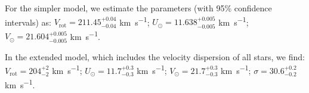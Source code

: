 For the simpler model, we estimate the parameters (with 95\% confidence intervals) as:  
$V_{\text{rot}} = 211.45_{-0.04}^{+0.04}$ \unit{\kilo\meter\per\second};  
$U_{\odot} = 11.638_{-0.005}^{+0.005}$ \unit{\kilo\meter\per\second};  
$V_{\odot} = 21.604_{-0.005}^{+0.005}$ \unit{\kilo\meter\per\second}.  

In the extended model, which includes the velocity dispersion of all stars, we find: 
$V_{\text{rot}} = 204_{-2}^{+2}$ \unit{\kilo\meter\per\second};  
$U_{\odot} = 11.7_{-0.3}^{+0.3}$ \unit{\kilo\meter\per\second};  
$V_{\odot} = 21.7_{-0.3}^{+0.3}$ \unit{\kilo\meter\per\second};  
$\sigma = 30.6_{-0.2}^{+0.2}$ \unit{\kilo\meter\per\second}.  

